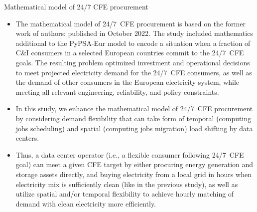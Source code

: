 \begin{frame}{Mathematical model of 24/7 CFE procurement}

  {\footnotesize
  \begin{itemize}
  \item The mathematical model of 24/7~CFE procurement is based on the former work of authors:  published in October 2022. The study included mathematics additional to the PyPSA-Eur model to encode a situation when a fraction of C\&I consumers in a selected European countries commit to the 24/7~CFE goals. The resulting problem optimized investment and operational decisions to meet projected electricity demand for the 24/7~CFE consumers, as well as the demand of other consumers in the European electricity system, while meeting all relevant engineering, reliability, and policy constraints.
  
  \item In this study, we enhance the mathematical model of 24/7~CFE procurement 
  by considering demand flexibility that can take form of \alert{temporal} (computing jobs scheduling) and \alert{spatial} (computing jobs migration) load shifting by data centers. 
  
  \item Thus, a data center operator (i.e., a flexible consumer following 24/7~CFE goal) can meet a given CFE target by either procuring energy generation and storage assets directly, and buying electricity from a local grid in hours when electricity mix is sufficiently clean  (like in the previous study), as well as utilize spatial and/or temporal flexibility to achieve hourly matching of demand with clean electricity more efficiently.

  \end{itemize}
  }

\end{frame}



